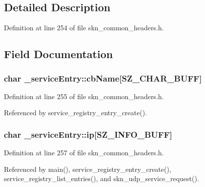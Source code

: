 \subsection{Detailed Description}


Definition at line 254 of file skn\+\_\+common\+\_\+headers.\+h.



\subsection{Field Documentation}
\hypertarget{struct__service_entry_ac654e9e33bf977ee6c36c46af83fbdd4}{}
\subsubsection[{cb\+Name}]{\setlength{\rightskip}{0pt plus 5cm}char \+\_\+service\+Entry\+::cb\+Name\mbox{[}{\bf S\+Z\+\_\+\+C\+H\+A\+R\+\_\+\+B\+U\+F\+F}\mbox{]}}\label{struct__service_entry_ac654e9e33bf977ee6c36c46af83fbdd4}


Definition at line 255 of file skn\+\_\+common\+\_\+headers.\+h.



Referenced by service\+\_\+registry\+\_\+entry\+\_\+create().

\hypertarget{struct__service_entry_a70b1db0895fbe31c07c8799cb57c678a}{}
\subsubsection[{ip}]{\setlength{\rightskip}{0pt plus 5cm}char \+\_\+service\+Entry\+::ip\mbox{[}{\bf S\+Z\+\_\+\+I\+N\+F\+O\+\_\+\+B\+U\+F\+F}\mbox{]}}\label{struct__service_entry_a70b1db0895fbe31c07c8799cb57c678a}


Definition at line 257 of file skn\+\_\+common\+\_\+headers.\+h.



Referenced by main(), service\+\_\+registry\+\_\+entry\+\_\+create(), service\+\_\+registry\+\_\+list\+\_\+entries(), and skn\+\_\+udp\+\_\+service\+\_\+request().

\hypertarget{struct__service_entry_aa66dcf0806f67276d049ac75c6153768}{}
